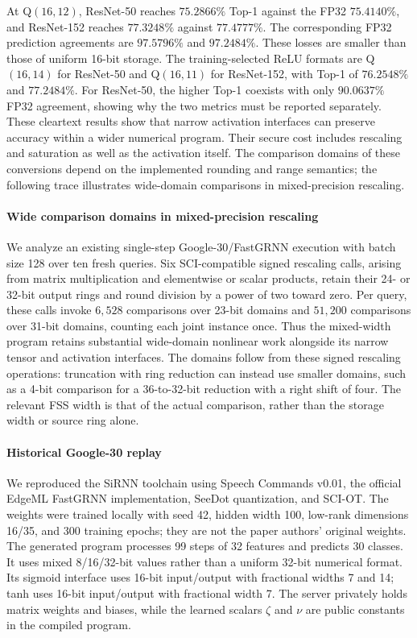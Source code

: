 \documentclass[journal]{IEEEtran}
\theoremstyle{definition}
\theoremstyle{plain}
\begin{document}
At Q$(16,12)$, ResNet-50 reaches $75.2866\%$ Top-1 against the FP32
$75.4140\%$, and ResNet-152 reaches $77.3248\%$ against $77.4777\%$.
The corresponding FP32 prediction agreements are $97.5796\%$ and
$97.2484\%$. These losses are smaller than those of uniform 16-bit storage.
The training-selected ReLU formats are Q$(16,14)$ for ResNet-50 and
Q$(16,11)$ for ResNet-152, with Top-1 of $76.2548\%$ and $77.2484\%$.
For ResNet-50, the higher Top-1 coexists with only $90.0637\%$ FP32 agreement,
showing why the two metrics must be reported separately. These cleartext results
show that narrow activation interfaces can preserve accuracy within a wider
numerical program. Their secure cost includes rescaling and saturation as well
as the activation itself. The comparison domains of these conversions depend
on the implemented rounding and range semantics; the following trace illustrates
wide-domain comparisons in mixed-precision rescaling.

\paragraph*{Wide comparison domains in mixed-precision rescaling}
We analyze an existing single-step Google-30/FastGRNN execution with batch size
128 over ten fresh queries. Six SCI-compatible signed rescaling calls, arising
from matrix multiplication and elementwise or scalar products, retain their
24- or 32-bit output rings and round division by a power of two toward zero.
Per query, these calls invoke $6{,}528$ comparisons over 23-bit domains and
$51{,}200$ comparisons over 31-bit domains, counting each joint instance once.
Thus the mixed-width program retains substantial wide-domain nonlinear work
alongside its narrow tensor and activation interfaces. The domains follow from
these signed rescaling operations: truncation with ring reduction can instead
use smaller domains, such as a 4-bit comparison for a 36-to-32-bit reduction
with a right shift of four. The relevant FSS width is that of the actual
comparison, rather than the storage width or source ring alone.

\paragraph*{Historical Google-30 replay}
We reproduced the SiRNN toolchain using Speech Commands v0.01, the official
EdgeML FastGRNN implementation, SeeDot quantization, and SCI-OT. The weights
were trained locally with seed 42, hidden width 100, low-rank dimensions 16/35,
and 300 training epochs; they are not the paper authors' original weights.
The generated program processes 99 steps of 32 features and predicts 30 classes.
It uses mixed 8/16/32-bit values rather than a uniform 32-bit numerical format.
Its sigmoid interface uses 16-bit input/output with fractional widths 7 and 14;
tanh uses 16-bit input/output with fractional width 7.
The server privately holds matrix weights and biases, while the learned
scalars $\zeta$ and $\nu$ are public constants in the compiled program.
\end{document}
